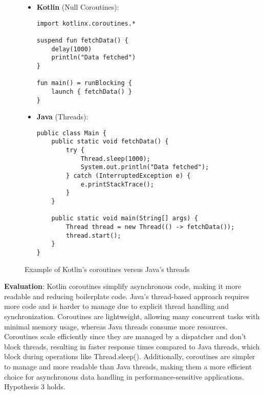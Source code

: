 \begin{figure}[H]
\centering	
\begin{tcolorbox}[colframe=blue!80!black, colback=blue!5!white, coltitle=blue!50!black, title={-}, boxrule=0.5mm, width=0.8\textwidth, sharp corners=south]
    \begin{itemize}
    \vspace{0.2cm}
        \item \textbf{\scriptsize Kotlin} \scriptsize (Null Coroutines):
        \begin{lstlisting}[style=kotlin, basicstyle=\scriptsize\ttfamily]
import kotlinx.coroutines.*

suspend fun fetchData() {
    delay(1000)
    println("Data fetched")
}

fun main() = runBlocking {
    launch { fetchData() }
}
        \end{lstlisting}
        
        \item \textbf{\scriptsize Java} \scriptsize (Threads):
        \begin{lstlisting}[style=java, basicstyle=\scriptsize\ttfamily]
public class Main {
    public static void fetchData() {
        try {
            Thread.sleep(1000);
            System.out.println("Data fetched");
        } catch (InterruptedException e) {
            e.printStackTrace();
        }
    }

    public static void main(String[] args) {
        Thread thread = new Thread(() -> fetchData());
        thread.start();
    }
}
        \end{lstlisting}
    \end{itemize}
\end{tcolorbox}
\caption{Example of Kotlin's coroutines versus Java's threads}
\label{coroutines_threads}
\end{figure}

\noindent \textbf{Evaluation}: Kotlin coroutines simplify asynchronous code, making it more readable and reducing boilerplate code. Java’s thread-based approach requires more code and is harder to manage due to explicit thread handling and synchronization. Coroutines are lightweight, allowing many concurrent tasks with minimal memory usage, whereas Java threads consume more resources. Coroutines scale efficiently since they are managed by a dispatcher and don't block threads, resulting in faster response times compared to Java threads, which block during operations like Thread.sleep(). Additionally, coroutines are simpler to manage and more readable than Java threads, making them a more efficient choice for asynchronous data handling in performance-sensitive applications. Hypothesis 3 holds.

